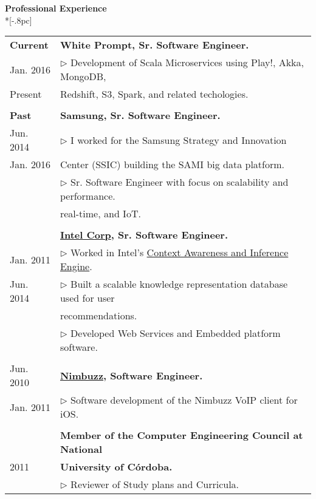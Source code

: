 \documentclass[letter,11pt,english]{article}
\begin{document}
{\large \bf Professional Experience}\\*[-.8pc]
\underline{\hspace{6in}}
\\
\begin{tabular}{ p{2cm} l }

  {\bf Current} 	& {\bf White Prompt, Sr. Software Engineer.}\\
   Jan. 2016    	& $\triangleright$ Development of Scala Microservices using Play!, Akka, MongoDB, \\ 
   Present      	& Redshift, S3, Spark, and related techologies. \\
                
\\
  {\bf Past}    	& {\bf Samsung, Sr. Software Engineer.}\\
   Jun. 2014   	& $\triangleright$ I worked for the Samsung Strategy and Innovation\\
   Jan. 2016    	& Center (SSIC) building the SAMI big data platform.\\
                	& $\triangleright$ Sr. Software Engineer with focus on scalability and performance.\\
                        & real-time, and IoT. \\
\\
  {\bf }    		& {\bf \href{http://www.intel.com}{Intel Corp}, Sr. Software Engineer.}\\
   Jan. 2011     	& $\triangleright$ Worked in Intel's \href{https://software.intel.com/en-us/context-sensing-sdk}{Context Awareness and  Inference Engine}.\\
   Jun. 2014	& $\triangleright$ Built a scalable knowledge representation database used for user\\               
                	& recommendations.\\
                	& $\triangleright$ Developed Web Services and Embedded platform software.\\
\\     
   Jun. 2010   	& {\bf \href{http://www.nimbuzz.com/en/about}{Nimbuzz}, Software Engineer.}\\
   Jan. 2011   	& $\triangleright$ Software development of the Nimbuzz VoIP client for iOS.\\ 
\\
           		& {\bf Member of the Computer Engineering Council at National} \\
  2011	       	& {\bf University of C\'ordoba.}\\ 
			& $\triangleright$ Reviewer of Study plans and Curricula.\\
\end{tabular}
\end{document}
